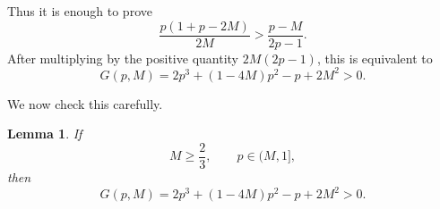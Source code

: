 \documentclass[onecolumn]{article}
\newtheorem{lemma}[theorem]{Lemma}
\begin{document}
Thus it is enough to prove 
\begin{equation}
\frac{p(1+p-2M)}{2M}>\frac{p-M}{2p-1}.  \label{1652}
\end{equation}%
After multiplying by the positive quantity $2M(2p-1)$, this is equivalent to 
\begin{equation}
G(p,M)=2p^{3}+(1-4M)p^{2}-p+2M^{2}>0.  \label{1653}
\end{equation}

We now check this carefully.

\begin{lemma}
\label{G-positive} If 
\begin{equation}
M\geq \frac{2}{3},\qquad p\in (M,1],  \label{1654}
\end{equation}%
then 
\begin{equation}
G(p,M)=2p^{3}+(1-4M)p^{2}-p+2M^{2}>0.  \label{1655}
\end{equation}
\end{lemma}
\end{document}
